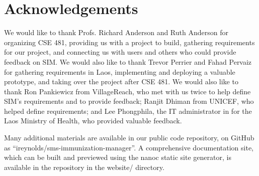\documentclass{acm_proc_article-sp}
\begin{document}
\section{Acknowledgements}

We would like to thank Profs. Richard Anderson and Ruth Anderson for organizing CSE 481, providing us with a project to build, gathering requirements for our project, and connecting us with users and others who could provide feedback on SIM. We would also like to thank Trevor Perrier and Fahad Pervaiz for gathering requirements in Laos, implementing and deploying a valuable prototype, and taking over the project after CSE 481. We would also like to thank Ron Pankiewicz from VillageReach, who met with us twice to help define SIM's requirements and to provide feedback; Ranjit Dhiman from UNICEF, who helped define requirements; and Lee Phongphila, the IT administrator in for the Laos Ministry of Health, who provided valuable feedback.


  
\balancecolumns

\appendix
Many additional materials are available in our public code repository, on GitHub as ``ireynolds/sms-immunization-manager''. A comprehensive documentation site, which can be built and previewed using the nanoc static site generator, is available in the repository in the website/ directory.
\end{document}
